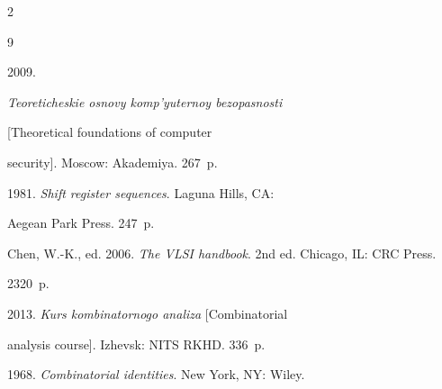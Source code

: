 \begin{multicols}{2}





\renewcommand{\bibname}{\protect\rmfamily References}







{\small\frenchspacing


 {%




 \begin{thebibliography}{9}


 


\vspace*{-8pt}







 2009. 


\textit{Teoreticheskie osnovy komp'yuternoy bezopasnosti} 


[Theoretical foundations of computer 


security]. Moscow: Akademiya. 267~p.




 1981. \textit{Shift register sequences}. Laguna Hills, CA: 


Aegean Park Press. 247~p.




Chen, W.-K., ed. 2006. \textit{The VLSI handbook}. 2nd ed. Chicago, IL: CRC Press. 


2320~p.





\pagebreak 


 




 2013. \textit{Kurs kombinatornogo analiza} [Combinatorial 


analysis course]. Izhevsk: NITS RKHD. 336~p.




 1968. \textit{Combinatorial identities}. New York, NY: Wiley. 



\end{thebibliography}}}
\end{multicols}

